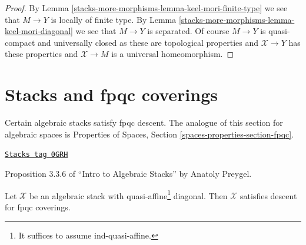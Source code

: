 \begin{proof}
By Lemma \ref{stacks-more-morphisms-lemma-keel-mori-finite-type}
we see that $M \to Y$ is locally of finite type.
By Lemma \ref{stacks-more-morphisms-lemma-keel-mori-diagonal} we see that
$M \to Y$ is separated.
Of course $M \to Y$ is quasi-compact and universally closed
as these are topological properties and $\mathcal{X} \to Y$
has these properties and $\mathcal{X} \to M$ is a universal
homeomorphism.
\end{proof}

\section{Stacks and fpqc coverings}
\label{stacks-more-morphisms-section-fpqc}
Certain algebraic stacks satisfy fpqc descent.
The analogue of this section for algebraic spaces
is Properties of Spaces, Section \ref{spaces-properties-section-fpqc}.


\begin{proposition}
\label{stacks-more-morphisms-proposition-stack-fpqc}
\href{https://stacks.math.columbia.edu/tag/0GRH}{\texttt{Stacks tag 0GRH}}

\begin{reference}
Proposition 3.3.6 of ``Intro to Algebraic Stacks'' by
Anatoly Preygel.
\end{reference}
Let $\mathcal{X}$ be an algebraic stack with quasi-affine\footnote{It suffices
to assume ind-quasi-affine.} diagonal. Then
$\mathcal{X}$ satisfies descent for fpqc coverings.
\end{proposition}

